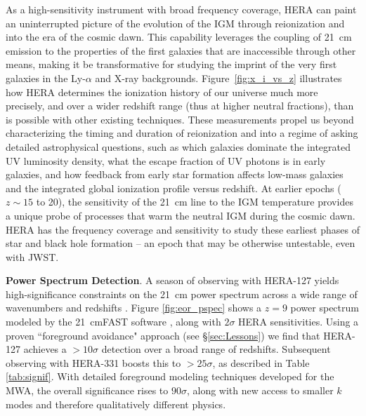 \documentclass[preprint]{aastex}
\newcommand{\Mycitep}[1]{{\bf \citep{#1}}}
\newcommand{\compress}{\vspace{-0.25in}}
\begin{document}
As a high-sensitivity instrument with broad frequency coverage, HERA can
paint an uninterrupted picture of the evolution of the IGM through reionization and into the era of the cosmic dawn.
This capability leverages the coupling of
21~cm emission to the properties of the first galaxies that
are inaccessible through other means, making it be transformative for
studying the imprint of the very first galaxies in the Ly-$\alpha$ and X-ray backgrounds.
Figure~\ref{fig:x_i_vs_z} illustrates how HERA
determines the ionization history of our universe much more precisely,
and over a wider redshift range (thus at higher neutral fractions), than is possible with other existing techniques.
These measurements propel us beyond characterizing the timing and duration of reionization and into a regime
of asking detailed astrophysical questions, such as which galaxies dominate the integrated UV luminosity density, what the escape fraction
of UV photons is in early galaxies, and how feedback from early star formation affects low-mass galaxies and
the integrated  global ionization profile versus redshift.
At earlier epochs ($z \sim 15$ to 20), the sensitivity of the 21~cm line
to the IGM temperature provides a unique probe of processes that warm the neutral IGM during the cosmic dawn.
HERA has the frequency coverage and
sensitivity to study these earliest phases of star and black hole formation -- an epoch that may be otherwise
untestable, even with JWST.


{\bf Power Spectrum Detection}. A season of observing with HERA-127 yields high-significance constraints on the 21~cm power
spectrum across a wide range of wavenumbers and redshifts \Mycitep{pober_et_al2014}.  
Figure \ref{fig:eor_pspec} shows a $z=9$ power spectrum modeled by the 21~cmFAST software \Mycitep{mesinger_et_al2011},
along with $2\sigma$ HERA sensitivities.  Using a proven ``foreground avoidance" approach (see \S\ref{sec:Lessons})
we find that
HERA-127 achieves a $> 10\sigma$ detection over a broad range of redshifts.
Subsequent observing with HERA-331 boosts this to $>25\sigma$, as described in Table \ref{tab:signif}.  With detailed foreground modeling techniques
developed for the MWA, the overall significance rises to $90\sigma$,
along with new access to smaller $k$ modes and therefore qualitatively different physics.
\end{document}
